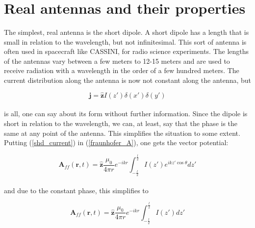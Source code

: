 \documentclass[a4paper,10pt]{thesis}
\begin{document}
\section{\textbf{Real antennas and their properties}}

\paragraph*{}
The simplest, real antenna is the short dipole. A short dipole has a length that is small in relation to the wavelength, but not infinitesimal. This sort of antenna is often used in spacecraft like CASSINI, for radio science experiments. The lengths of the antennas vary between a few meters to 12-15 meters and are used to receive radiation with a wavelength in the order of a few hundred meters. The current distribution along the antenna is now not constant along the antenna, but

\begin{equation}\label{shd_current}
 \mathbf{j} = \mathbf{\hat{z}} I(z') \delta (x') \delta (y')
\end{equation}

\paragraph*{}
is all, one can say about its form without further information. Since the dipole is short in relation to the wavelength, we can, at least, say that the phase is the same at any point of the antenna. This simplifies the situation to some extent. Putting (\ref{shd_current}) in (\ref{fraunhofer_A}), one gets the vector potential:

\begin{equation}\label{shd_A}
 \mathbf{A}_{ff}(\mathbf{r},t) = \mathbf{\hat{z} }\frac{\mu_0}{4 \pi r} e^{-ikr} \int_{-\frac{l}{2}}^{\frac{l}{2}} I(z') e^{ik z'\cos \theta } dz'
\end{equation}

\paragraph*{}
and due to the constant phase, this simplifies to

\begin{equation}\label{shd_A_simpl}
\mathbf{A}_{ff}(\mathbf{r},t) = \mathbf{\hat{z}} \frac{\mu_0}{4 \pi r} e^{-ikr} \int_{-\frac{l}{2}}^{\frac{l}{2}} I(z') dz'
\end{equation}
\end{document}

